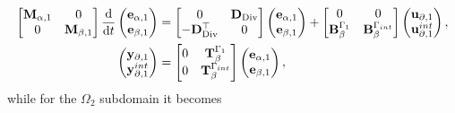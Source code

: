 \documentclass[11pt,a4paper]{article}
\DeclareMathOperator*{\Div}{Div}
\begin{document}
\begin{equation}
    \begin{split}
        \begin{bmatrix}
            \mathbf{M}_{\alpha, 1} & 0 \\
            0 & \mathbf{M}_{\beta, 1}
        \end{bmatrix}\odv{}{t}
        \begin{pmatrix}
            \mathbf{e}_{\alpha,1} \\
            \mathbf{e}_{\beta,1}
        \end{pmatrix} &= 
        \begin{bmatrix}
            0 & \mathbf{D}_{\Div} \\
            -\mathbf{D}_{\Div}^\top & 0 
        \end{bmatrix}
        \begin{pmatrix}
            \mathbf{e}_{\alpha,1} \\
            \mathbf{e}_{\beta,1}
        \end{pmatrix} + 
        \begin{bmatrix}
            0 & 0 \\
            \mathbf{B}_{\beta}^{\Gamma_1} & \mathbf{B}_{\beta}^{\Gamma_{\rm int}}
        \end{bmatrix}
        \begin{pmatrix}
            \mathbf{u}_{\partial,1} \\
            \mathbf{u}_{\partial,1}^{\rm int}
        \end{pmatrix}, \\
        \begin{pmatrix}
            \mathbf{y}_{\partial,1} \\
            \mathbf{y}_{\partial,1}^{\rm int}
        \end{pmatrix} &= 
        \begin{bmatrix}
            0 & \mathbf{T}_\beta^{\Gamma_1} \\
            0 & \mathbf{T}_\beta^{\Gamma_{\rm int}}
        \end{bmatrix}
        \begin{pmatrix}
            \mathbf{e}_{\alpha,1} \\
            \mathbf{e}_{\beta,1}
        \end{pmatrix},
    \end{split}
\end{equation}
while for the $\Omega_2$ subdomain it becomes
\end{document}
